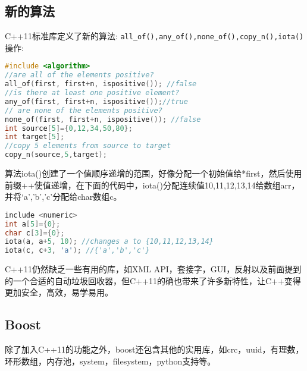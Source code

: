 \subsection{新的算法}
C++11标准库定义了新的算法: \verb$all_of(),any_of(),none_of(),copy_n(),iota()$操作:
\begin{lstlisting}[language=C++]
#include <algorithm>      
//are all of the elements positive?  
all_of(first, first+n, ispositive()); //false  
//is there at least one positive element?   
any_of(first, first+n, ispositive());//true    
// are none of the elements positive?    
none_of(first, first+n, ispositive()); //false 
int source[5]={0,12,34,50,80};  
int target[5];  
//copy 5 elements from source to target  
copy_n(source,5,target);
\end{lstlisting}

算法iota()创建了一个值顺序递增的范围，好像分配一个初始值给*first，然后使用前缀++使值递增，在下面的代码中，iota()分配连续值{10,11,12,13,14}给数组arr，并将{‘a’,’b’,’c’}分配给char数组c。
\begin{lstlisting}[language=C++]
include <numeric> 
int a[5]={0};  
char c[3]={0};  
iota(a, a+5, 10); //changes a to {10,11,12,13,14}  
iota(c, c+3, 'a'); //{'a','b','c'}
\end{lstlisting}

C++11仍然缺乏一些有用的库，如XML API，套接字，GUI，反射以及前面提到的一个合适的自动垃圾回收器，但C++11的确也带来了许多新特性，让C++变得更加安全，高效，易学易用。

\subsection{Boost}
除了加入C++11的功能之外，boost还包含其他的实用库，如crc，uuid，有理数，环形数组，内存池，system，filesystem，python支持等。


